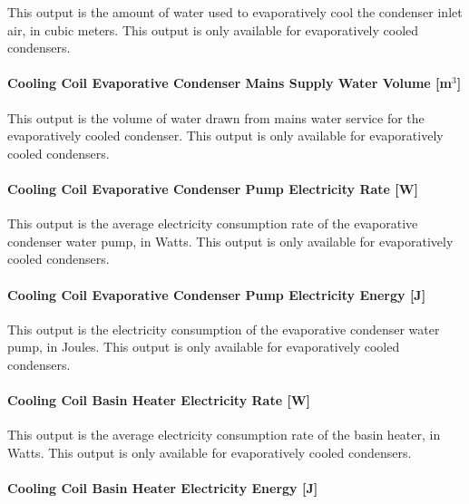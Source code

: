 This output is the amount of water used to evaporatively cool the condenser inlet air, in cubic meters. This output is only available for evaporatively cooled condensers.

\paragraph{Cooling Coil Evaporative Condenser Mains Supply Water Volume {[}m\(^{3}\){]}}\label{cooling-coil-evaporative-condenser-mains-supply-water-volume-m3-2}

This output is the volume of water drawn from mains water service for the evaporatively cooled condenser. This output is only available for evaporatively cooled condensers.

\paragraph{Cooling Coil Evaporative Condenser Pump Electricity Rate {[}W{]}}\label{cooling-coil-evaporative-condenser-pump-electric-power-w-1}

This output is the average electricity consumption rate of the evaporative condenser water pump, in Watts. This output is only available for evaporatively cooled condensers.

\paragraph{Cooling Coil Evaporative Condenser Pump Electricity Energy {[}J{]}}\label{cooling-coil-evaporative-condenser-pump-electric-energy-j-2}

This output is the electricity consumption of the evaporative condenser water pump, in Joules. This output is only available for evaporatively cooled condensers.

\paragraph{Cooling Coil Basin Heater Electricity Rate {[}W{]}}\label{cooling-coil-basin-heater-electric-power-w-2}

This output is the average electricity consumption rate of the basin heater, in Watts. This output is only available for evaporatively cooled condensers.

\paragraph{Cooling Coil Basin Heater Electricity Energy {[}J{]}}\label{cooling-coil-basin-heater-electric-energy-j-2}


